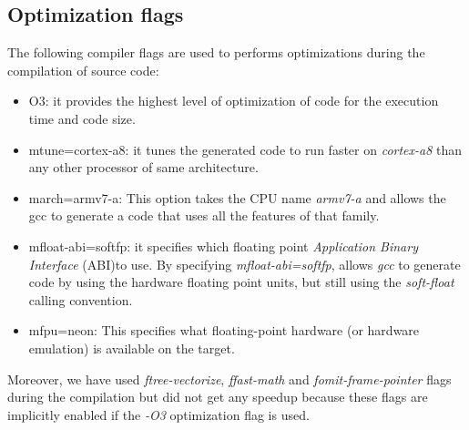 \subsection{Optimization flags}

The following compiler flags are used to performs optimizations during the compilation of source code:

\begin{itemize}
\item{O3:} it provides the highest level of optimization of code for the execution time and code size.
\item{mtune=cortex-a8:} it tunes the generated code to run faster on \emph{cortex-a8} than any other processor of same architecture.
\item{march=armv7-a:} This option takes the CPU name \emph{armv7-a} and allows the gcc to generate a code that uses all the features of that family.
\item{mfloat-abi=softfp:} it specifies which floating point \emph{Application Binary Interface} (ABI)to use. By specifying \emph{mfloat-abi=softfp}, allows \emph{gcc} to generate code by using the hardware floating point units, but still using the \emph{soft-float} calling convention.
\item{mfpu=neon:} This specifies what floating-point hardware (or hardware emulation) is available on the target.
\end{itemize}

Moreover, we have used \emph{ftree-vectorize}, \emph{ffast-math} and \emph{fomit-frame-pointer} flags during the compilation but did not get any speedup because these flags are implicitly enabled if the \emph{-O3} optimization flag is used.

